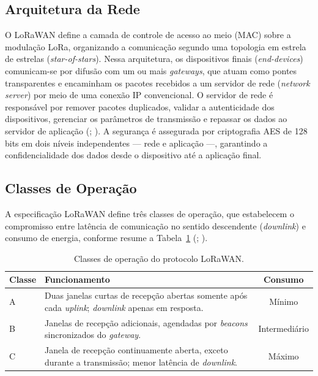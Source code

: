 \subsection{Arquitetura da Rede}
\label{sec:arqLora}

O LoRaWAN define a camada de controle de acesso ao meio (MAC) sobre a modulação LoRa, organizando a comunicação segundo uma topologia em estrela de estrelas (\textit{star-of-stars}). Nessa arquitetura, os dispositivos finais (\textit{end-devices}) comunicam-se por difusão com um ou mais \textit{gateways}, que atuam como pontes transparentes e encaminham os pacotes recebidos a um servidor de rede (\textit{network server}) por meio de uma conexão IP convencional. O servidor de rede é responsável por remover pacotes duplicados, validar a autenticidade dos dispositivos, gerenciar os parâmetros de transmissão e repassar os dados ao servidor de aplicação (; ). A segurança é assegurada por criptografia AES de 128 bits em dois níveis independentes — rede e aplicação —, garantindo a confidencialidade dos dados desde o dispositivo até a aplicação final.

\subsection{Classes de Operação}
\label{sec:classesLora}

A especificação LoRaWAN define três classes de operação, que estabelecem o compromisso entre latência de comunicação no sentido descendente (\textit{downlink}) e consumo de energia, conforme resume a Tabela~\ref{tab:classesLora} (; ).

\begin{table}[h]
    \centering
    \caption{Classes de operação do protocolo LoRaWAN.}
    \begin{tabular}{l|>{\arraybackslash}m{6.5cm}|c}
        \textbf{Classe} & \textbf{Funcionamento} & \textbf{Consumo} \\ \hline
        A & Duas janelas curtas de recepção abertas somente após cada \textit{uplink}; \textit{downlink} apenas em resposta. & Mínimo \\ \hline
        B & Janelas de recepção adicionais, agendadas por \textit{beacons} sincronizados do \textit{gateway}. & Intermediário \\ \hline
        C & Janela de recepção continuamente aberta, exceto durante a transmissão; menor latência de \textit{downlink}. & Máximo \\ \hline
    \end{tabular}
    \label{tab:classesLora}
\end{table}

